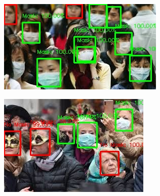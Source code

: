 \begin{figure}[H]
  \centering
  \begin{subfigure}[b]{0.4\linewidth}
    \includegraphics[width=\linewidth]{resources/images149-37.jpg}
  \end{subfigure}
  \begin{subfigure}[b]{0.34\linewidth}
    \includegraphics[width=\linewidth]{resources/images218-93.jpg}
  \end{subfigure}
  

\end{figure}
